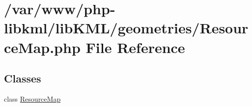 \hypertarget{ResourceMap_8php}{
\section{/var/www/php-\/libkml/libKML/geometries/ResourceMap.php File Reference}
\label{de/d41/ResourceMap_8php}
}
\subsection*{Classes}
\begin{DoxyCompactItemize}
\item 
class \hyperlink{classResourceMap}{ResourceMap}
\end{DoxyCompactItemize}
